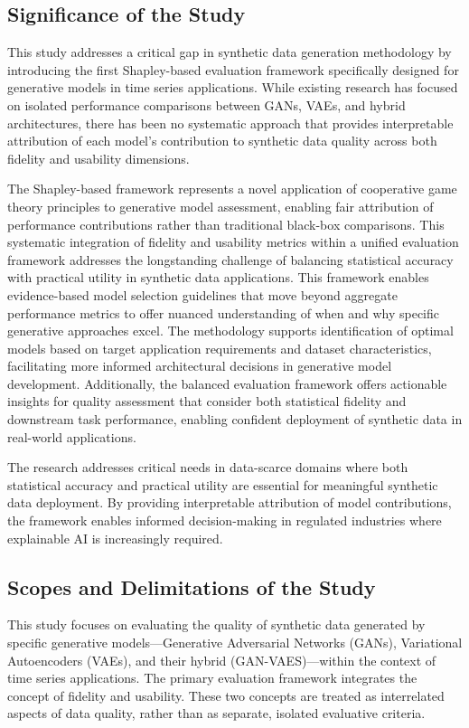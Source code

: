 \documentclass{article}
\begin{document}
\subsection{Significance of the Study}

This study addresses a critical gap in synthetic data generation methodology by introducing the first Shapley-based evaluation framework specifically designed for generative models in time series applications. While existing research has focused on isolated performance comparisons between GANs, VAEs, and hybrid architectures, there has been no systematic approach that provides interpretable attribution of each model's contribution to synthetic data quality across both fidelity and usability dimensions.

The Shapley-based framework represents a novel application of cooperative game theory principles to generative model assessment, enabling fair attribution of performance contributions rather than traditional black-box comparisons. This systematic integration of fidelity and usability metrics within a unified evaluation framework addresses the longstanding challenge of balancing statistical accuracy with practical utility in synthetic data applications. This framework enables evidence-based model selection guidelines that move beyond aggregate performance metrics to offer nuanced understanding of when and why specific generative approaches excel. The methodology supports identification of optimal models based on target application requirements and dataset characteristics, facilitating more informed architectural decisions in generative model development. Additionally, the balanced evaluation framework offers actionable insights for quality assessment that consider both statistical fidelity and downstream task performance, enabling confident deployment of synthetic data in real-world applications.

The research addresses critical needs in data-scarce domains where both statistical accuracy and practical utility are essential for meaningful synthetic data deployment. By providing interpretable attribution of model contributions, the framework enables informed decision-making in regulated industries where explainable AI is increasingly required.

\subsection{Scopes and Delimitations of the Study}
This study focuses on evaluating the quality of synthetic data generated by specific generative models—Generative Adversarial Networks (GANs), Variational Autoencoders (VAEs), and their hybrid (GAN-VAES)—within the context of time series applications. The primary evaluation framework integrates the concept of fidelity and usability. These two concepts are treated as interrelated aspects of data quality, rather than as separate, isolated evaluative criteria.
\end{document}
